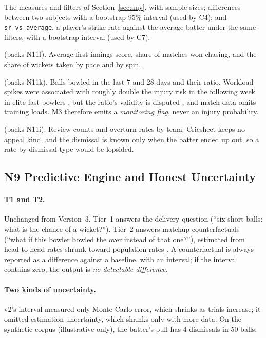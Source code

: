 \documentclass[11pt,a4paper]{article}
\begin{document}
\begin{description}[leftmargin=1.2em,style=nextline,itemsep=2pt]
\item[M1 --- delivery statistics, any filters $\times$ measures.] The measures
  and filters of Section~\ref{sec:any}, with sample sizes; differences between
  two subjects with a bootstrap 95\% interval (used by C4); and
  \texttt{sr\_vs\_average}, a player's strike rate against the average batter
  under the same filters, with a bootstrap interval (used by C7).
\item[M2 --- venue profile] (backs N11f). Average first-innings score, share of
  matches won chasing, and the share of wickets taken by pace and by spin.
\item[M3 --- bowling workload] (backs N11k). Balls bowled in the last 7 and 28
  days and their ratio. Workload spikes were associated with roughly double the
  injury risk in the following week in elite fast bowlers \cite{hulin}, but the
  ratio's validity is disputed \cite{impellizzeri}, and match data omits training
  loads. M3 therefore emits a \emph{monitoring flag}, never an injury
  probability.
\item[M4 --- DRS reviews] (backs N11i). Review counts and overturn rates by team.
  Cricsheet keeps no appeal kind, and the dismissal is known only when the batter
  ended up out, so a rate by dismissal type would be lopsided.
\end{description}

\subsection{N9 Predictive Engine and Honest Uncertainty}
\label{sec:uncert}

\paragraph{T1 and T2.} Unchanged from Version~3. Tier~1 answers the delivery
question (``six short balls: what is the chance of a wicket?''). Tier~2 answers
matchup counterfactuals (``what if this bowler bowled the over instead of that
one?''), estimated from head-to-head rates shrunk toward population rates
\cite{efron}. A counterfactual is always reported as a difference against a
baseline, with an interval; if the interval contains zero, the output is
\emph{no detectable difference}.

\paragraph{Two kinds of uncertainty.} v2's interval measured only Monte Carlo
error, which shrinks as trials increase; it omitted estimation uncertainty,
which shrinks only with more data. On the synthetic corpus (illustrative only),
the batter's pull has 4 dismissals in 50 balls:
\end{document}
